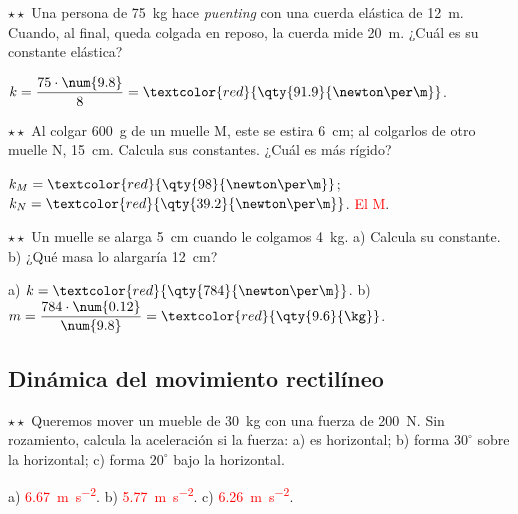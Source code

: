 \begin{exercise}
    \(\star\star\) Una persona de \qty{75}{\kg} hace \textit{puenting} con una cuerda elástica de \qty{12}{\m}. Cuando, al final, queda
    colgada en reposo, la cuerda mide \qty{20}{\m}. ¿Cuál es su constante elástica?
    \begin{solu}
        \(k = \dfrac{75 \cdot \num{9.8}}{8} = \textcolor{red}{\qty{91.9}{\newton\per\m}}\).
    \end{solu}
\end{exercise}

\begin{exercise}
    \(\star\star\) Al colgar \qty{600}{\g} de un muelle M, este se estira \qty{6}{\cm}; al colgarlos de otro muelle N, \qty{15}{\cm}.
    Calcula sus constantes. ¿Cuál es más rígido?
    \begin{solu}
        \(k_M = \textcolor{red}{\qty{98}{\newton\per\m}}\); \(k_N = \textcolor{red}{\qty{39.2}{\newton\per\m}}\). \textcolor{red}{El M}.
    \end{solu}
\end{exercise}

\begin{exercise}
    \(\star\star\) Un muelle se alarga \qty{5}{\cm} cuando le colgamos \qty{4}{\kg}. a) Calcula su constante. b) ¿Qué masa lo alargaría
    \qty{12}{\cm}?
    \begin{solu}
        a) \(k = \textcolor{red}{\qty{784}{\newton\per\m}}\). b) \(m = \dfrac{784 \cdot \num{0.12}}{\num{9.8}} = \textcolor{red}{\qty{9.6}{\kg}}\).
    \end{solu}
\end{exercise}

\subsection{Dinámica del movimiento rectilíneo}

\begin{exercise}
    \(\star\star\) Queremos mover un mueble de \qty{30}{\kg} con una fuerza de \qty{200}{\newton}. Sin rozamiento, calcula la aceleración si
    la fuerza: a) es horizontal; b) forma \(30^\circ\) sobre la horizontal; c) forma \(20^\circ\) bajo la horizontal.
    \begin{solu}
        a) \textcolor{red}{\qty{6.67}{\m\per\s\squared}}. b) \textcolor{red}{\qty{5.77}{\m\per\s\squared}}. c) \textcolor{red}{\qty{6.26}{\m\per\s\squared}}.
    \end{solu}
\end{exercise}

